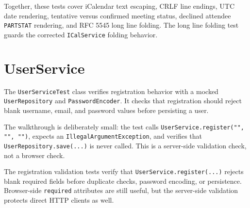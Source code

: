 Together, these tests cover iCalendar text escaping, CRLF line endings, UTC date rendering, tentative versus confirmed meeting status, declined attendee \texttt{PARTSTAT} rendering, and RFC 5545 long line folding. The long line folding test guards the corrected \texttt{ICalService} folding behavior.

\section{UserService}

The \texttt{UserServiceTest} class verifies registration behavior with a mocked \texttt{UserRepository} and \texttt{PasswordEncoder}. It checks that registration should reject blank username, email, and password values before persisting a user.

The walkthrough is deliberately small: the test calls \texttt{UserService.register("", "", "")}, expects an \texttt{IllegalArgumentException}, and verifies that \texttt{UserRepository.save(...)} is never called. This is a server-side validation check, not a browser check.

The registration validation tests verify that \texttt{UserService.register(...)} rejects blank required fields before duplicate checks, password encoding, or persistence. Browser-side \texttt{required} attributes are still useful, but the server-side validation protects direct HTTP clients as well.
